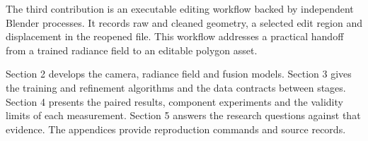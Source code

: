 The third contribution is an executable editing workflow backed by independent Blender processes. It records raw and cleaned geometry, a selected edit region and displacement in the reopened file. This workflow addresses a practical handoff from a trained radiance field to an editable polygon asset.

Section 2 develops the camera, radiance field and fusion models. Section 3 gives the training and refinement algorithms and the data contracts between stages. Section 4 presents the paired results, component experiments and the validity limits of each measurement. Section 5 answers the research questions against that evidence. The appendices provide reproduction commands and source records.
